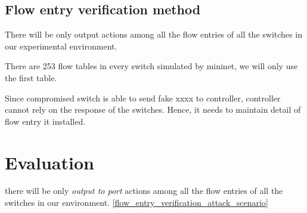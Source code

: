 \subsection{Flow entry verification method}
There will be only output actions among all the flow entries of all the switches in our experimental environment.


There are 253 flow tables in every switch simulated by mininet, we will only use the first table.

Since compromised switch is able to send fake xxxx to controller, controller cannot rely on the response of the switches. Hence, it needs to maintain detail of flow entry it installed. 

\section{Evaluation}


there will be only \textit{output to port} actions among all the flow entries of all the switches in our environment. \ref{flow_entry_verification_attack_scenario} 